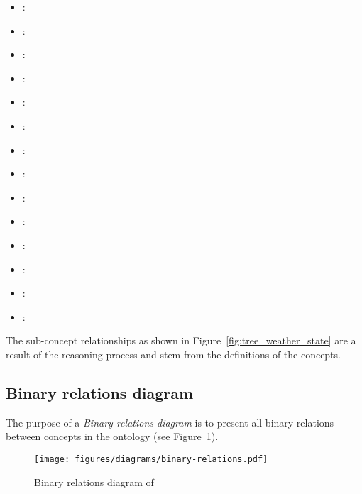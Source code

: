 \begin{itemize}
  \item {}: %
  
  \item {}: %
  
  \item {}: %
  
  \item {}: %
  
  \item {}: %
  
  \item {}: %
  
  \item {}: %
  
  \item {}: %

  \item {}: %
  
  \item {}: %
  
  \item {}: %
  
  \item {}: %
  
  \item {}: %
  
  \item {}: %
\end{itemize}


The sub-concept relationships as shown in Figure~\ref{fig:tree_weather_state} are a result of the reasoning process and stem from the definitions of the concepts. %

\subsection{Binary relations diagram}
\label{subsec:binary_relations_diagram}

The purpose of a \emph{Binary relations diagram} is to present all binary relations between concepts in the ontology (see Figure~\ref{fig:binary_relations}).

\begin{figure}
  \centering
  \texttt{[image: figures/diagrams/binary-relations.pdf]}
  \caption{Binary relations diagram of \smarthomeweather}
  \label{fig:binary_relations}
\end{figure}

